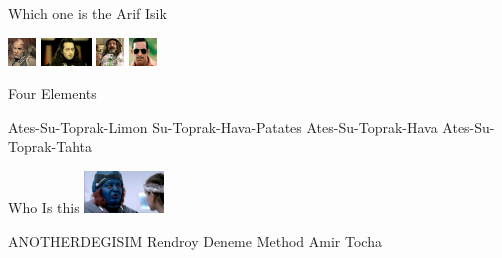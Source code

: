 \documentclass{exam}
\begin{document}
\begin{questions}
\question Which one is the Arif Isik\newline
\begin{oneparchoices}
\choice \includegraphics[height=2em]{216.jpg}
\choice \includegraphics[height=2em]{komutanlogar.jpeg}
\choice \includegraphics[height=2em]{faruk.jpg}
\choice \includegraphics[height=2em]{arifisik.jpg}
\end{oneparchoices}
\question Four Elements\newline
\begin{oneparchoices}
\choice Ates-Su-Toprak-Limon
\choice Su-Toprak-Hava-Patates
\choice Ates-Su-Toprak-Hava
\choice Ates-Su-Toprak-Tahta
\end{oneparchoices}
\question Who Is this\newline
\includegraphics[height=3em]{rendroy2.jpg} \newline
\begin{oneparchoices}
\choice ANOTHERDEGISIM
\choice Rendroy
\choice Deneme Method
\choice Amir Tocha
\end{oneparchoices}
\end{questions}
\end{document}
